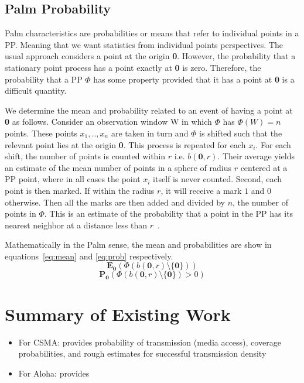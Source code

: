 \documentclass[a4paper]{article}
\begin{document}
\subsection{Palm Probability}
%
Palm characteristics are probabilities or means that refer to individual points in a PP.  Meaning that we want statistics from individual points perspectives.  The usual approach considers a point at the origin \textbf{0}. However, the probability that a stationary point process has a point exactly at \textbf{0} is zero. Therefore, the probability that a PP $\Phi$ has some property provided that it has a point at \textbf{0} is a difficult quantity.\par
%
We determine the mean and probability related to an event of having a point at \textbf{0} as follows.  Consider an observation window W in which
$\Phi$ has $\Phi(W) = n$ points. These points $x_1,..,x_n$ are taken in turn and $\Phi$ is shifted such that the relevant point lies at the origin \textbf{0}.  This process is repeated for each $x_i$.  For each shift, the number of points is counted within $r$ i.e. $b(\textbf{0},r)$.  Their average yields an estimate of the mean number of points in a sphere of radius $r$ centered at a PP point, where in all cases the point $x_i$ itself is never counted.  Second, each point is then marked.  If within the radius $r$, it will receive a mark $1$ and $0$ otherwise.  Then all the marks are then added and divided by $n$, the number of points in $\Phi$.  This is an estimate of the probability that a point in the PP has its nearest neighbor at a distance less than $r$~\cite{Illian2008}.\par
%
Mathematically in the Palm sense, the mean and probabilities are show in equations~\eqref{eq:mean} and \eqref{eq:prob} respectively.
%
\begin{equation}\label{eq:mean}
  \textbf{E}_\textbf{0}(\Phi(b(\textbf{0},r) \setminus \{\textbf{0}\}))
\end{equation}
\begin{equation}\label{eq:prob}
  \textbf{P}_\textbf{0}(\Phi(b(\textbf{0},r) \setminus \{\textbf{0}\})>0)
\end{equation}
%
\section{Summary of Existing Work}
%
\cite{baccelli2009stochasticVII}
\begin{itemize}
  \item For CSMA: provides probability of transmission (media access), coverage probabilities, and rough estimates for successful transmission density
  \item For Aloha: provides
\end{itemize}
\end{document}
